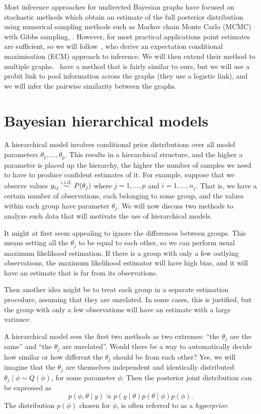 \documentclass[a4paper, 11pt, oneside]{report}
\newcommand{\iid}{\stackrel{\textmd{i.i.d.}}{\sim}}
\newcommand{\1}{\mathds{1}}
\begin{document}
Most inference approaches for undirected Bayesian graphs have focused on
stochastic methods which obtain an estimate of the full posterior distribution
using numerical sampling methods such as Markov chain Monte Carlo (MCMC) with
Gibbs sampling, \parencite{wang-2015}. However, for most practical applications
point estimates are sufficient, so we will follow~\cite{limcco-2017}, who
derive an expectation conditional maximisation (ECM) approach to inference. We
will then extend their method to multiple graphs.~\cite{luke2017} have a method that is
fairly similar to ours, but we will use a probit link to pool
information across the graphs (they use a logistic link), and we will infer the
pairwise similarity between the graphs.

\section{Bayesian hierarchical models}
A hierarchical model involves conditional prior distributions over all model parameters
$\theta_1, \dots, \theta_p$. This results in a hierarchical structure, and the
higher a parameter is placed
up the hierarchy, the higher the number of samples we need to have to produce
confident estimates of it.
For example, suppose that we observe values $y_{ij} \iid P(\theta_j)$ where $j=1,\dots,p$ and
$i=1,\dots,n_j$. That is, we have a certain number of observations,
each belonging to some group, and the values within each group have
parameter $\theta_j$. We will now discuss two methods to analyze such data
that will motivate the use of hierarchical models.

It might at first seem appealing to ignore the differences between groups. This
means setting all the $\theta_j$ to be equal to each other, so we can perform
usual maximum likelihood estimation. If there is a group with only a few
outlying observations, the maximum likelihood estimator will have high bias, and it will have an estimate that is far from its observations.

Then another idea might be to treat each group in a separate estimation procedure, assuming
that they are unrelated. In some cases, this is
justified, but the group with only a few
observations will have an estimate with a large variance.

A hierarchical model sees the first two methods as two
extremes: ``the $\theta_j$ are the same'' and ``the $\theta_j$ are unrelated''.
Would there be a way to automatically decide how similar or how different the $\theta_j$ should be from each other?
Yes, we will imagine that the $\theta_j$ are themselves independent and identically distributed
$\theta_j \mid \phi \sim Q(\phi)$, for some parameter $\phi$. Then the posterior
joint distribution can be expressed as
\[p(\phi, \theta \mid y) \propto p(y \mid \theta) p(\theta \mid \phi) p(\phi).\]
The distribution $p(\phi)$ chosen for $\phi$, is often
referred to as a \emph{hyperprior}.
\end{document}
